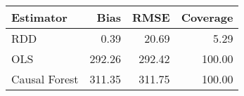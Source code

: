 \begin{table}[ht]
\centering
\begin{tabular}{lrrr}
  \hline
Estimator & Bias & RMSE & Coverage \\ 
  \hline
RDD & 0.39 & 20.69 & 5.29 \\ 
  OLS & 292.26 & 292.42 & 100.00 \\ 
  Causal Forest & 311.35 & 311.75 & 100.00 \\ 
   \hline
\end{tabular}
\end{table}

